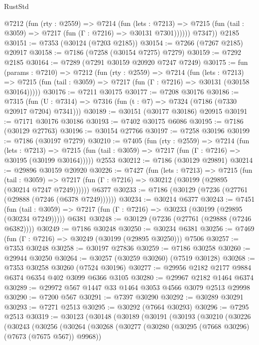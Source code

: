 \begin{lexlean}{RustStd}
\begin{coremodule}
          @7212
            (fun (rty : @2559) =>
            @7214
              (fun (lets : @7213) =>
              @7215 (fun (tail : @3059) => @7217 (fun (Γ : @7216) => @30131 @7301))))))
        @7347))
    @2185
@30151 := @7353 (@30124 (@7203 @2185))
@30154 := @7266 (@7267 @2185) @20917
@30158 := @7186 (@7258 (@30154 @7275) @7279)
@30159 := @7292 @2185
@30164 := @7289 (@7291 @30159 @20920 @7247 @7249)
@30175 := fun (params : @7210) =>
  @7212
    (fun (rty : @2559) =>
    @7214
      (fun (lets : @7213) =>
      @7215 (fun (tail : @3059) => @7217 (fun (Γ : @7216) => @30131 (@30158 @30164)))))
@30176 := @7211 @30175
@30177 := @7208 @30176
@30186 := @7315
    (fun (U : @7314) => @7316 (fun (t : @7) => @7324 (@7186 (@7330 @20917 @7204) @7341)))
@30189 := @30151 (@30177 @30186) @20915
@30191 := @7171 @30176 @30186
@30193 := @7402 @30175 @6086
@30195 := @7186 (@30129 @27763)
@30196 := @30154 @27766
@30197 := @7258 @30196
@30199 := @7186 (@30197 @7279)
@30210 := @7405
    (fun (rty : @2559) =>
    @7214
      (fun (lets : @7213) =>
      @7215 (fun (tail : @3059) => @7217 (fun (Γ : @7216) => @30195 (@30199 @30164)))))
    @2553
@30212 := @7186 (@30129 @29891)
@30214 := @29896 @30159 @20920
@30226 := @7427
    (fun (lets : @7213) =>
    @7215
      (fun (tail : @3059) =>
      @7217 (fun (Γ : @7216) => @30212 (@30199 (@29895 (@30214 @7247 @7249))))))
    @6377
@30233 := @7186 (@30129 (@7236 (@27761 (@29888 (@7246 (@6378 @7249))))))
@30234 := @30214 @6377
@30243 := @7451
    (fun (tail : @3059) => @7217 (fun (Γ : @7216) => @30233 (@30199 (@29895 (@30234 @7249)))))
    @6381
@30248 := @30129 (@7236 (@27761 (@29888 (@7246 @6382))))
@30249 := @7186 @30248
@30250 := @30234 @6381
@30256 := @7469 (fun (Γ : @7216) => @30249 (@30199 (@29895 @30250))) @7506
@30257 := @7353 @30248
@30258 := @30197 @27836
@30259 := @7186 @30258
@30260 := @29944 @30250
@30264 := @30257 (@30259 @30260) (@7519 @30128)
@30268 := @7353 @30258 @30260 (@7524 @30196)
@30277 := @29956 @2182 @2177 @9884 @6374 @6354 @402 @3099 @6366 @3105
@30280 := @29967 @2182 @1464 @6374
@30289 := @29972 @567 @1447 @33 @1464 @3053 @4566 @3079 @2513 @29998
@30290 := @7200 @567
@30291 := @7397 @30290
@30292 := @30289 @30291
@30293 := @7271 @2513
@30295 := @30292 (@7664 @30293)
@30296 := @7295 @2513
@30319 := @30123
    (@30148
      (@30189
        (@30191
          (@30193
            (@30210
              (@30226
                (@30243
                  (@30256
                    (@30264
                      (@30268
                        (@30277
                          (@30280 (@30295 (@7668 @30296) (@7673 (@7675 @567)) @9968))

\end{coremodule}
\end{lexlean}
